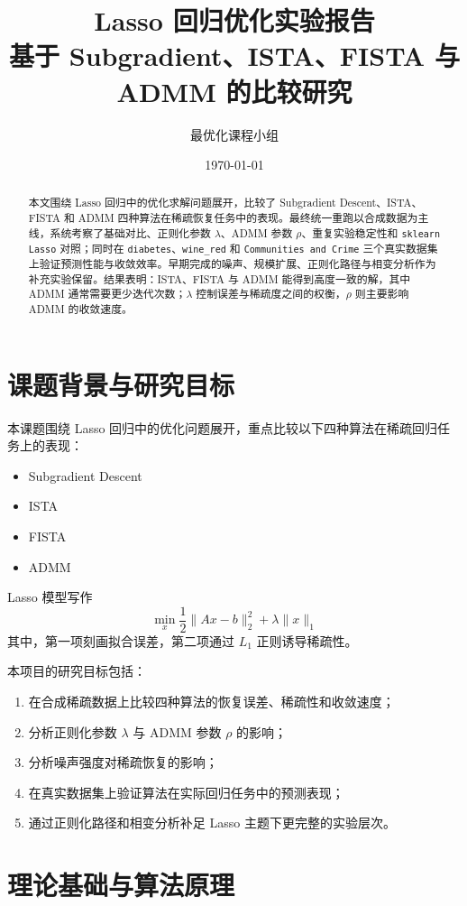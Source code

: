\documentclass[12pt,a4paper]{ctexart}
\title{Lasso 回归优化实验报告\\
\large 基于 Subgradient、ISTA、FISTA 与 ADMM 的比较研究}
\author{最优化课程小组}
\date{\today}
\begin{document}
\maketitle

\begin{abstract}
本文围绕 Lasso 回归中的优化求解问题展开，比较了 Subgradient Descent、ISTA、FISTA 和 ADMM 四种算法在稀疏恢复任务中的表现。最终统一重跑以合成数据为主线，系统考察了基础对比、正则化参数 $\lambda$、ADMM 参数 $\rho$、重复实验稳定性和 \texttt{sklearn Lasso} 对照；同时在 \texttt{diabetes}、\texttt{wine\_red} 和 \texttt{Communities and Crime} 三个真实数据集上验证预测性能与收敛效率。早期完成的噪声、规模扩展、正则化路径与相变分析作为补充实验保留。结果表明：ISTA、FISTA 与 ADMM 能得到高度一致的解，其中 ADMM 通常需要更少迭代次数；$\lambda$ 控制误差与稀疏度之间的权衡，$\rho$ 则主要影响 ADMM 的收敛速度。
\end{abstract}

\section{课题背景与研究目标}
本课题围绕 Lasso 回归中的优化问题展开，重点比较以下四种算法在稀疏回归任务上的表现：
\begin{itemize}[leftmargin=2em]
    \item Subgradient Descent
    \item ISTA
    \item FISTA
    \item ADMM
\end{itemize}

Lasso 模型写作
\[
\min_x \frac{1}{2}\|Ax-b\|_2^2 + \lambda \|x\|_1
\]
其中，第一项刻画拟合误差，第二项通过 $L_1$ 正则诱导稀疏性。

本项目的研究目标包括：
\begin{enumerate}[label=\arabic*.]
    \item 在合成稀疏数据上比较四种算法的恢复误差、稀疏性和收敛速度；
    \item 分析正则化参数 $\lambda$ 与 ADMM 参数 $\rho$ 的影响；
    \item 分析噪声强度对稀疏恢复的影响；
    \item 在真实数据集上验证算法在实际回归任务中的预测表现；
    \item 通过正则化路径和相变分析补足 Lasso 主题下更完整的实验层次。
\end{enumerate}

\section{理论基础与算法原理}
\end{document}
